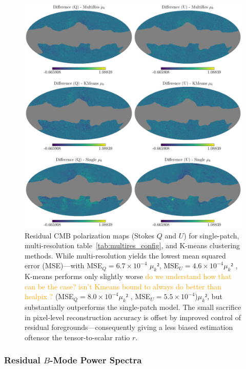 \documentclass[fleqn,usenatbib]{mnras}
\newcommand{\je}[1]{\textcolor{orange}{#1}}
\begin{document}
\begin{figure}
    \centering
    \includegraphics[width=\linewidth]{figures/cmb_recon.pdf}
    \caption{
    Residual CMB polarization maps (Stokes \( Q \) and \( U \)) for single-patch, multi-resolution table~\ref{tab:multires_config}, and K-means clustering methods.  
    While multi-resolution yields the lowest mean squared error (MSE)—with MSE\(_Q = 6.7 \times 10^{-4}\) $\mu_k²$, MSE\(_U = 4.6 \times 10^{-4}\)$\mu_k²$ , K-means performs only slightly worse \je{do we understand how that can be the case? isn't Kmeans bound to always do better than healpix ?} (MSE\(_Q = 8.0 \times 10^{-4}\)$\mu_k²$ , MSE\(_U = 5.5 \times 10^{-4}\))$\mu_k²$,  but substantially outperforms the single-patch model. 
    The small sacrifice in pixel-level reconstruction accuracy is offset by improved control of residual foregrounds—consequently giving a less biased estimation oftensor the tensor-to-scalar ratio \( r \).
    }
    \label{fig:cmb_qu_comparison}
\end{figure}

\subsubsection*{Residual \( B \)-Mode Power Spectra}
\label{subsec:residual_bb_spectra}
\end{document}
